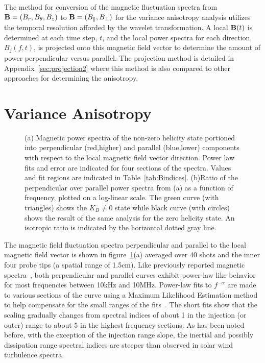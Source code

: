 \documentclass[preprint2]{aastex}
\begin{document}
The method for conversion of the magnetic fluctuation spectra from ${\bf B} = (B_{r},B_{\theta},B_{z})$ to ${\bf B} = (B_{\parallel},B_{\perp})$ for the variance anisotropy analysis utilizes the temporal resolution afforded by the wavelet transformation. A local ${\bf B}(t)$ is determined at each time step, $t$, and the local power spectra for each direction, $B_{j}(f,t)$, is projected onto this magnetic field vector to determine the amount of power perpendicular versus parallel. The projection method is detailed in Appendix~\ref{sec:projection2} where this method is also compared to other approaches for determining the anisotropy.

\section{Variance Anisotropy}\label{sec:variance}

\begin{figure}
\caption{\label{fig:spectra} (a) Magnetic power spectra of the non-zero helicity state portioned into perpendicular (red,higher) and parallel (blue,lower) components with respect to the local magnetic field vector direction. Power law fits and error are indicated for four sections of the spectra. Values and fit regions are indicated in Table~\ref{tab:Bindices}. (b)Ratio of the perpendicular over parallel power spectra from (a) as a function of frequency, plotted on a log-linear scale. The green curve (with triangles) shows the $K_{B}\neq 0$ state while black curve (with circles) shows the result of the same analysis for the zero helicity state. An isotropic ratio is indicated by the horizontal dotted gray line.}
\end{figure}

The magnetic field fluctuation spectra perpendicular and parallel to the local magnetic field vector is shown in figure~\ref{fig:spectra}(a) averaged over 40 shots and the inner four probe tips (a spatial range of 1.5cm). Like previously reported magnetic spectra~\citep{sch14a}, both perpendicular and parallel curves exhibit power-law like behavior for most frequencies between 10kHz and 10MHz. Power-law fits to $f^{-\alpha}$ are made to various sections of the curve using a Maximum Likelihood Estimation method~\citep{cla09} to help compensate for the small ranges of the fits~\citep{dud13}. The short fits show that the scaling gradually changes from spectral indices of about 1 in the injection (or outer) range to about 5 in the highest frequency sections. As has been noted before, with the exception of the injection range slope, the inertial and possibly dissipation range spectral indices are steeper than observed in solar wind turbulence spectra.
\end{document}
